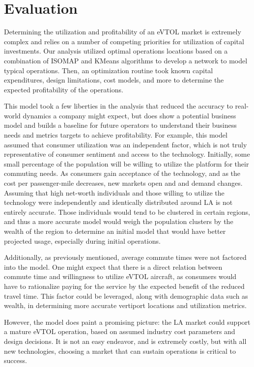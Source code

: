\documentclass{article}
\begin{document}
\section{Evaluation}

Determining the utilization and profitability of an eVTOL market is extremely complex and relies on a number of competing priorities for utilization of capital investments. Our analysis utilized optimal operations locations based on a combination of ISOMAP and KMeans algorithms to develop a network to model typical operations. Then, an optimization routine took known capital expenditures, design limitations, cost models, and more to determine the expected profitability of the operations.

This model took a few liberties in the analysis that reduced the accuracy to real-world dynamics a company might expect, but does show a potential business model and builds a baseline for future operators to understand their business needs and metrics targets to achieve profitability. For example, this model assumed that consumer utilization was an independent factor, which is not truly representative of consumer sentiment and access to the technology. Initially, some small percentage of the population will be willing to utilize the platform for their commuting needs. As consumers gain acceptance of the technology, and as the cost per passenger-mile decreases, new markets open and and demand changes. Assuming that high net-worth individuals and those willing to utilize the technology were independently and identically distributed around LA is not entirely accurate. Those individuals would tend to be clustered in certain regions, and thus a more accurate model would weigh the population clusters by the wealth of the region to determine an initial model that would have better projected usage, especially during initial operations.

Additionally, as previously mentioned, average commute times were not factored into the model. One might expect that there is a direct relation between commute time and willingness to utilize eVTOL aircraft, as consumers would have to rationalize paying for the service by the expected benefit of the reduced travel time. This factor could be leveraged, along with demographic data such as wealth, in determining more accurate vertiport locations and utilization metrics.

However, the model does paint a promising picture: the LA market could support a mature eVTOL operation, based on assumed industry cost parameters and design decisions. It is not an easy endeavor, and is extremely costly, but with all new technologies, choosing a market that can sustain operations is critical to success.
\end{document}
